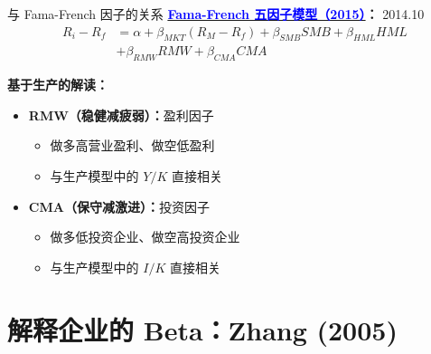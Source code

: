 \documentclass{beamer}
\begin{document}
\begin{frame}{与 Fama-French 因子的关系}
    \textbf{\href{https://doi.org/10.1016/j.jfineco.2014.10.010}{\textcolor{blue}{Fama-French 五因子模型（2015）}}：} 2014.10
    \begin{equation*}
    \begin{aligned}
        R_i - R_f &= \alpha + \beta_{MKT}(R_M - R_f) + \beta_{SMB}SMB + \beta_{HML}HML \\
        &+ \beta_{RMW}RMW + \beta_{CMA}CMA
    \end{aligned}
    \end{equation*}

    \textbf{基于生产的解读：}
    \begin{itemize}
        \item \textbf{RMW（稳健减疲弱）：}盈利因子
        \begin{itemize}
            \item 做多高营业盈利、做空低盈利
            \item 与生产模型中的 $Y/K$ 直接相关
        \end{itemize}

        \item \textbf{CMA（保守减激进）：}投资因子
        \begin{itemize}
            \item 做多低投资企业、做空高投资企业
            \item 与生产模型中的 $I/K$ 直接相关
        \end{itemize}
    \end{itemize}
\end{frame}

\section{解释企业的 Beta：Zhang (2005)}
\end{document}
